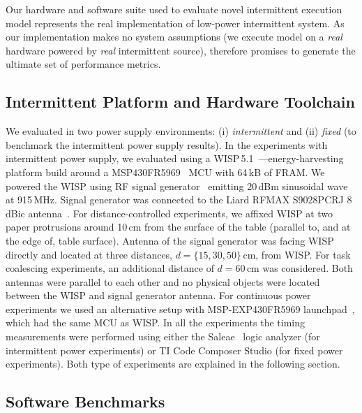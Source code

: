 Our hardware and software suite used to evaluate \sys novel intermittent execution model represents the  real implementation of low-power intermittent system. As our implementation makes no system assumptions (we execute \sys model on a \emph{real} hardware powered by \emph{real} intermittent source), therefore promises to generate the ultimate set of \sys performance metrics. 

\subsection{Intermittent Platform and Hardware Toolchain}
\label{sec:results_hardware_software}

We evaluated \sys in two power supply environments: (i)  \emph{intermittent} and (ii) \emph{fixed} (to benchmark the intermittent power supply results). In the experiments with intermittent power supply, we evaluated \sys using a WISP\,5.1~\cite{wisp5,wisp}---energy-harvesting platform build around a MSP430FR5969~\cite{wolverine} MCU with 64\,kB of FRAM. We powered the WISP using RF signal generator~\cite{} emitting 20\,dBm sinusoidal wave at 915\,MHz.  Signal generator was connected to the Liard RFMAX S9028PCRJ 8\,dBic antenna~\cite{atlas2015}. For distance-controlled experiments, we affixed WISP at two paper protrusions around 10\,cm from the surface of the table (parallel to, and at the edge of, table surface). Antenna of the signal generator was facing WISP directly and located at three distances, $d=\{15, 30, 50\}$\,cm, from WISP. For task coalescing experiments, an additional distance of $d=60$\,cm was considered. Both antennas were parallel to each other and no physical objects were located between the WISP and signal generator antenna. For continuous power experiments we used an alternative setup with MSP-EXP430FR5969 launchpad~\cite{MSP-EXP430FR5969_launchpad}, which had the same MCU as WISP. In all the experiments the timing measurements were performed using either the Saleae~\cite{saleae} logic analyzer (for intermittent power experiments) or TI Code Composer Studio (for fixed power experiments). Both type of experiments are explained in the following section.

\subsection{Software Benchmarks}
\label{sec:software_benchmarks}

